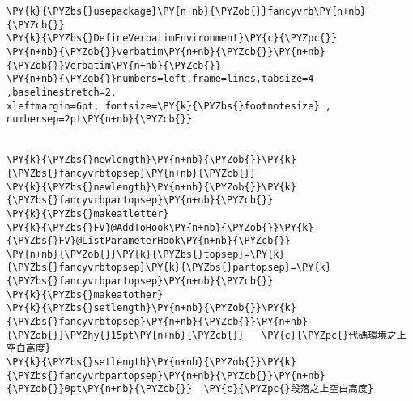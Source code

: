 \begin{Verbatim}[commandchars=\\\{\}]
\PY{k}{\PYZbs{}usepackage}\PY{n+nb}{\PYZob{}}fancyvrb\PY{n+nb}{\PYZcb{}}
\PY{k}{\PYZbs{}DefineVerbatimEnvironment}\PY{c}{\PYZpc{}}
\PY{n+nb}{\PYZob{}}verbatim\PY{n+nb}{\PYZcb{}}\PY{n+nb}{\PYZob{}}Verbatim\PY{n+nb}{\PYZcb{}}
\PY{n+nb}{\PYZob{}}numbers=left,frame=lines,tabsize=4 ,baselinestretch=2,
xleftmargin=6pt, fontsize=\PY{k}{\PYZbs{}footnotesize} , numbersep=2pt\PY{n+nb}{\PYZcb{}}


\PY{k}{\PYZbs{}newlength}\PY{n+nb}{\PYZob{}}\PY{k}{\PYZbs{}fancyvrbtopsep}\PY{n+nb}{\PYZcb{}}
\PY{k}{\PYZbs{}newlength}\PY{n+nb}{\PYZob{}}\PY{k}{\PYZbs{}fancyvrbpartopsep}\PY{n+nb}{\PYZcb{}}
\PY{k}{\PYZbs{}makeatletter}
\PY{k}{\PYZbs{}FV}@AddToHook\PY{n+nb}{\PYZob{}}\PY{k}{\PYZbs{}FV}@ListParameterHook\PY{n+nb}{\PYZcb{}}
\PY{n+nb}{\PYZob{}}\PY{k}{\PYZbs{}topsep}=\PY{k}{\PYZbs{}fancyvrbtopsep}\PY{k}{\PYZbs{}partopsep}=\PY{k}{\PYZbs{}fancyvrbpartopsep}\PY{n+nb}{\PYZcb{}}
\PY{k}{\PYZbs{}makeatother}
\PY{k}{\PYZbs{}setlength}\PY{n+nb}{\PYZob{}}\PY{k}{\PYZbs{}fancyvrbtopsep}\PY{n+nb}{\PYZcb{}}\PY{n+nb}{\PYZob{}}\PYZhy{}15pt\PY{n+nb}{\PYZcb{}}   \PY{c}{\PYZpc{}代碼環境之上空白高度}
\PY{k}{\PYZbs{}setlength}\PY{n+nb}{\PYZob{}}\PY{k}{\PYZbs{}fancyvrbpartopsep}\PY{n+nb}{\PYZcb{}}\PY{n+nb}{\PYZob{}}0pt\PY{n+nb}{\PYZcb{}}  \PY{c}{\PYZpc{}段落之上空白高度}
\end{Verbatim}
